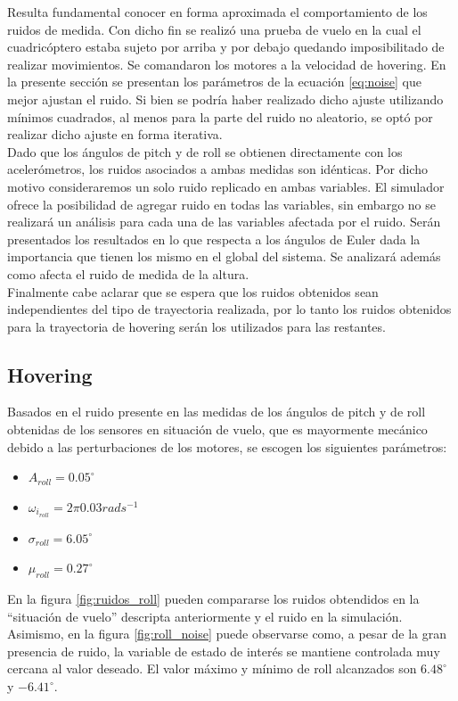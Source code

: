 \documentclass[main]{subfiles}
\begin{document}
Resulta fundamental conocer en forma aproximada el comportamiento de los ruidos de medida. Con dicho fin se realiz\'o una prueba de vuelo en la cual el cuadric\'optero estaba sujeto por arriba y por debajo quedando imposibilitado de realizar movimientos. Se comandaron los motores a la velocidad de hovering. En la presente secci\'on se presentan los par\'ametros de la ecuaci\'on \ref{eq:noise} que mejor ajustan el ruido. Si bien se podr\'ia haber realizado dicho ajuste utilizando m\'inimos cuadrados, al menos para la parte del ruido no aleatorio, se opt\'o por realizar dicho ajuste en forma iterativa.\\

Dado que los \'angulos de pitch y de roll se obtienen directamente con los aceler\'ometros, los ruidos asociados a ambas medidas son id\'enticas. Por dicho motivo consideraremos un solo ruido replicado en ambas variables. El simulador ofrece la posibilidad de agregar ruido en todas las variables, sin embargo no se realizar\'a un an\'alisis para cada una de las variables afectada por el ruido. Ser\'an presentados los resultados en lo que respecta a los \'angulos de Euler dada la importancia que tienen los mismo en el global del sistema. Se analizar\'a adem\'as como afecta el ruido de medida de la altura.\\

Finalmente cabe aclarar que se espera que los ruidos obtenidos sean independientes del tipo de trayectoria realizada, por lo tanto los ruidos obtenidos para la trayectoria de hovering ser\'an los utilizados para las restantes. 
\subsection{Hovering}

Basados en el ruido presente en las medidas de los \'angulos de pitch y de roll obtenidas de los sensores en situaci\'on de vuelo, que es mayormente mec\'anico debido a las perturbaciones de los motores, se escogen los siguientes par\'ametros:

\begin{itemize}
\item $A_{roll} = 0.05^\circ$
\item $\omega_{i_{roll}} = 2\pi 0.03 rads^{-1}$
\item $\sigma_{roll} = 6.05^\circ$
\item $\mu_{roll} = 0.27 ^\circ$
\end{itemize}

En la figura \ref{fig:ruidos_roll} pueden compararse los ruidos obtendidos en la ``situaci\'on de vuelo'' descripta anteriormente y el ruido en la simulaci\'on. Asimismo, en la figura \ref{fig:roll_noise} puede observarse como, a pesar de la gran presencia de ruido, la variable de estado de inter\'es se mantiene controlada muy cercana al valor deseado. El valor m\'aximo y m\'inimo de roll alcanzados son $6.48^\circ$ y $-6.41^\circ$.\\
\end{document}
